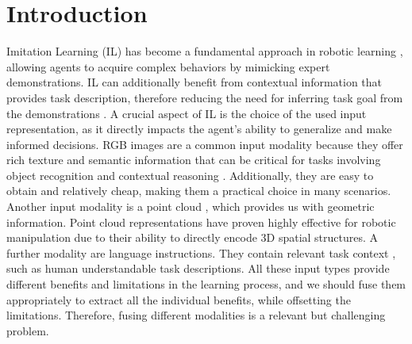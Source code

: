\section{Introduction}
\label{sec:introduction}


Imitation Learning (IL) has become a fundamental approach in robotic learning \cite{brohan2022rt, chi2023diffusion, zhao2023learning, black2024pi_0, kim24openvla}, allowing agents to acquire complex behaviors by mimicking expert demonstrations. IL can additionally benefit from contextual information that provides task description, therefore reducing the need for inferring task goal from the demonstrations \cite{ding2019goal}. %
A crucial aspect of IL is the choice of the used input representation, as it directly impacts the agent's ability to generalize and make informed decisions. 
RGB images are a common input modality because they offer rich texture and semantic information that can be critical for tasks involving object recognition and contextual reasoning \cite{mandlekar2021matters,reuss2024multimodal,liu2024rdt}.  Additionally, they are easy to obtain and relatively cheap, making them a practical choice in many scenarios.
Another input modality is a point cloud \cite{zhu2024point, ze20243d, ke20243d}, which provides us with geometric information. Point cloud representations have proven highly effective for robotic manipulation due to their ability to directly encode 3D spatial structures. A further modality are language instructions.  They contain relevant task context \cite{stepputtis2020language, li2023vision, reuss2024multimodal}, such as human understandable task descriptions. All these input types provide different benefits and limitations in the learning process, and we should fuse them appropriately to extract all the individual benefits, while offsetting the limitations. Therefore, fusing different modalities is a relevant but challenging problem.

